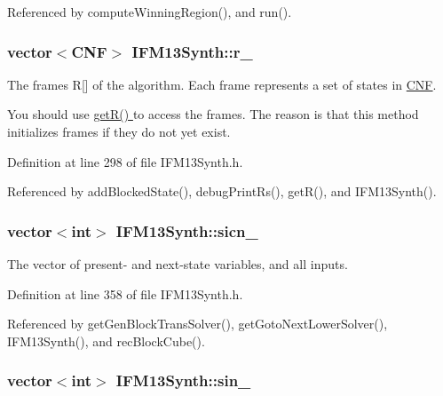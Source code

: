 Referenced by compute\-Winning\-Region(), and run().

\hypertarget{classIFM13Synth_a10aead75cfca1b96cdd6c17f6825a9b7}{
\subsubsection[{r\-\_\-}]{\setlength{\rightskip}{0pt plus 5cm}vector$<${\bf C\-N\-F}$>$ I\-F\-M13\-Synth\-::r\-\_\-\hspace{0.3cm}{\ttfamily [protected]}}}\label{classIFM13Synth_a10aead75cfca1b96cdd6c17f6825a9b7}


The frames R\mbox{[}\mbox{]} of the algorithm. Each frame represents a set of states in \hyperlink{classCNF}{C\-N\-F}. 

You should use \hyperlink{classIFM13Synth_a050f0c3c5089ef6c5f793878bd60abc9}{get\-R() } to access the frames. The reason is that this method initializes frames if they do not yet exist. 

Definition at line 298 of file I\-F\-M13\-Synth.\-h.



Referenced by add\-Blocked\-State(), debug\-Print\-Rs(), get\-R(), and I\-F\-M13\-Synth().

\hypertarget{classIFM13Synth_abb5b5fc0fe0db0e7aff06d22547e00bd}{
\subsubsection[{sicn\-\_\-}]{\setlength{\rightskip}{0pt plus 5cm}vector$<$int$>$ I\-F\-M13\-Synth\-::sicn\-\_\-\hspace{0.3cm}{\ttfamily [protected]}}}\label{classIFM13Synth_abb5b5fc0fe0db0e7aff06d22547e00bd}


The vector of present-\/ and next-\/state variables, and all inputs. 



Definition at line 358 of file I\-F\-M13\-Synth.\-h.



Referenced by get\-Gen\-Block\-Trans\-Solver(), get\-Goto\-Next\-Lower\-Solver(), I\-F\-M13\-Synth(), and rec\-Block\-Cube().

\hypertarget{classIFM13Synth_ac35a6617ca45b2aa1823c99ae7c984a4}{
\subsubsection[{sin\-\_\-}]{\setlength{\rightskip}{0pt plus 5cm}vector$<$int$>$ I\-F\-M13\-Synth\-::sin\-\_\-\hspace{0.3cm}{\ttfamily [protected]}}}\label{classIFM13Synth_ac35a6617ca45b2aa1823c99ae7c984a4}


